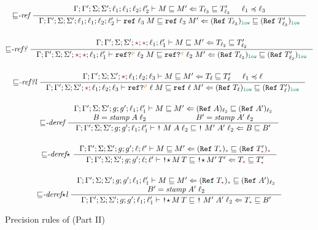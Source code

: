 \begin{figure}[tbp]
{\begin{gather*}
  \\[3ex]
    {\sqsubseteq}\textit{-ref}~
    \inference{\precctx{\Gamma}{\Gamma'}{\Sigma}{\Sigma'}{\ell_1}{\ell_1}{\ell_2}{\ell_2'}\ccprec{M}{M'}{T_{\ell_3}}{T'_{\ell_3}} &
               \ell_1 \preccurlyeq \ell_3}
              {\precctx{\Gamma}{\Gamma'}{\Sigma}{\Sigma'}{\ell_1}{\ell_1}{\ell_2}{\ell_2'}\ccprec{\ccref{\ell_3}{M}}{\ccref{\ell_3}{M'}}{(\Refer{T_{\ell_3}})_{\low}}{(\Refer{T'_{\ell_3}})_{\low}}}
  \\[3ex]
    {\sqsubseteq}\textit{-ref?}~
    \inference{\precctx{\Gamma}{\Gamma'}{\Sigma}{\Sigma'}{\unk}{\unk}{\ell_1}{\ell_1'}\ccprec{M}{M'}{T_{\ell_2}}{T'_{\ell_2}}}
              {\precctx{\Gamma}{\Gamma'}{\Sigma}{\Sigma'}{\unk}{\unk}{\ell_1}{\ell_1'}\ccprec{\ccrefproj{\ell_2}{M}{p}}{\ccrefproj{\ell_2}{M'}{q}}{(\Refer{T_{\ell_2}})_{\low}}{(\Refer{T'_{\ell_2}})_{\low}}}
  \\[3ex]
  {\sqsubseteq}\textit{-ref?l}~
  \inference{\precctx{\Gamma}{\Gamma'}{\Sigma}{\Sigma'}{\unk}{\ell_1}{\ell_2}{\ell_3}\ccprec{M}{M'}{T_\ell}{T'_\ell} &
             \ell_1 \preccurlyeq \ell}
  {\precctx{\Gamma}{\Gamma'}{\Sigma}{\Sigma'}{\unk}{\ell_1}{\ell_2}{\ell_3}\ccprec{\ccrefproj{\ell}{M}{p}}{\ccref{\ell}{M'}}{(\Refer{T_\ell})_{\low}}{(\Refer{T'_\ell})_{\low}}}
  \\[3ex]
  {\sqsubseteq}\textit{-deref}~
  \inference{\precctx{\Gamma}{\Gamma'}{\Sigma}{\Sigma'}{g}{g'}{\ell_1}{\ell_1'}\ccprec{M}{M'}{(\Refer{A})_{\ell_2}}{(\Refer{A'})_{\ell_2}} \\
  B = \mathit{stamp}\;A\;\ell_2 & B' = \mathit{stamp}\;A'\;\ell_2}
  {\precctx{\Gamma}{\Gamma'}{\Sigma}{\Sigma'}{g}{g'}{\ell_1}{\ell_1'}\ccprec{\ccderef{M}{A}{\ell_2}}{\ccderef{M'}{A'}{\ell_2}}{B}{B'}}
  \\[3ex]
    {\sqsubseteq}\textit{-deref}{\star}~
    \inference{\precctx{\Gamma}{\Gamma'}{\Sigma}{\Sigma'}{g}{g'}{\ell}{\ell'}\ccprec{M}{M'}{(\Refer{T_{\unk}})_{\unk}}{(\Refer{T'_{\unk}})_{\unk}}}
              {\precctx{\Gamma}{\Gamma'}{\Sigma}{\Sigma'}{g}{g'}{\ell}{\ell'}\ccprec{\ccderefstar{M}{T}}{\ccderefstar{M'}{T'}}{T_{\unk}}{T'_{\unk}}}
  \\[3ex]
    {\sqsubseteq}\textit{-deref${\star}$l}~
    \inference{\precctx{\Gamma}{\Gamma'}{\Sigma}{\Sigma'}{g}{g'}{\ell_1}{\ell_1'}\ccprec{M}{M'}{(\Refer{T_{\unk}})_{\unk}}{(\Refer{A'})_{\ell_2}} \\
               B' = \mathit{stamp}\;A'\;\ell_2}
              {\precctx{\Gamma}{\Gamma'}{\Sigma}{\Sigma'}{g}{g'}{\ell_1}{\ell_1'}\ccprec{\ccderefstar{M}{T}}{\ccderef{M'}{A'}{\ell_2}}{T_{\unk}}{B'}}
  \end{gather*}}
  \caption{Precision rules of \CC (Part II)}
  \label{fig:cc-prec-2}
\end{figure}


